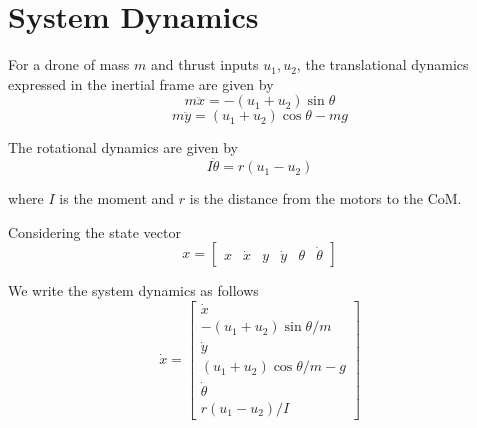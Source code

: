 \section{\textbf{System Dynamics}}

\noindent For a drone of mass $m$ and thrust inputs $u_1,u_2$, the translational dynamics expressed in the inertial frame are given by
\[ m\ddot{x} = - (u_1 + u_2) \sin \theta \]
\[ m\ddot{y} = (u_1 + u_2) \cos \theta - mg\]

\noindent The rotational dynamics are given by
\[ I\ddot{\theta} = r(u_1 - u_2) \]

\noindent where $I$ is the moment and $r$ is the distance from the motors to the CoM.

\noindent Considering the state vector
\[ x = \begin{bmatrix}
    x & \dot{x} & y & \dot{y} & \theta & \dot{\theta}
\end{bmatrix}\]

\noindent We write the system dynamics as follows
\[ \dot{x} = \begin{bmatrix}
    \dot{x} \\
    -(u_1 + u_2) \sin\theta / m \\
    \dot{y} \\
    (u_1 + u_2) \cos\theta / m - g \\
    \dot{\theta} \\
    r(u_1 - u_2) / I
\end{bmatrix} \]
